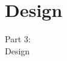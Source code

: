 \section{Design}
\begin{frame}[fragile]
  \vspace{25mm}
  \begin{center}
    \Huge{Part 3:\\Design}
  \end{center}
\end{frame}
